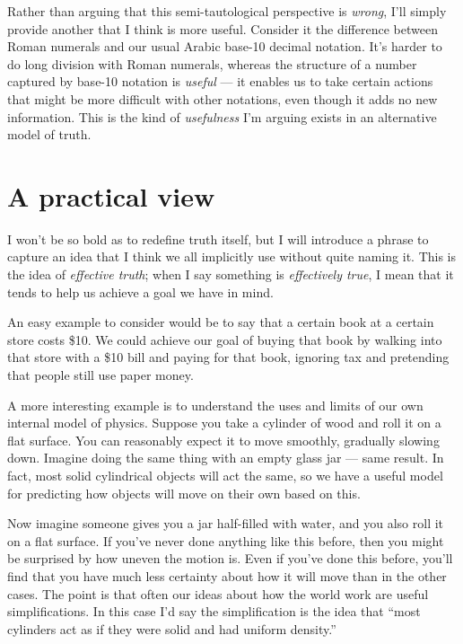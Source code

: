 \documentclass[20pt,]{extarticle}
\begin{document}
Rather than arguing that this semi-tautological perspective is
\emph{wrong}, I'll simply provide another that I think is more useful.
Consider it the difference between Roman numerals and our usual Arabic
base-10 decimal notation. It's harder to do long division with Roman
numerals, whereas the structure of a number captured by base-10 notation
is \emph{useful} --- it enables us to take certain actions that might be
more difficult with other notations, even though it adds no new
information. This is the kind of \emph{usefulness} I'm arguing exists in
an alternative model of truth.

\section{A practical view}\label{a-practical-view}

I won't be so bold as to redefine truth itself, but I will introduce a
phrase to capture an idea that I think we all implicitly use without
quite naming it. This is the idea of \emph{effective truth}; when I say
something is \emph{effectively true}, I mean that it tends to help us
achieve a goal we have in mind.

An easy example to consider would be to say that a certain book at a
certain store costs \$10. We could achieve our goal of buying that book
by walking into that store with a \$10 bill and paying for that book,
ignoring tax and pretending that people still use paper money.

A more interesting example is to understand the uses and limits of our
own internal model of physics. Suppose you take a cylinder of wood and
roll it on a flat surface. You can reasonably expect it to move
smoothly, gradually slowing down. Imagine doing the same thing with an
empty glass jar --- same result. In fact, most solid cylindrical objects
will act the same, so we have a useful model for predicting how objects
will move on their own based on this.

Now imagine someone gives you a jar half-filled with water, and you also
roll it on a flat surface. If you've never done anything like this
before, then you might be surprised by how uneven the motion is. Even if
you've done this before, you'll find that you have much less certainty
about how it will move than in the other cases. The point is that often
our ideas about how the world work are useful simplifications. In this
case I'd say the simplification is the idea that ``most cylinders act as
if they were solid and had uniform density.''
\end{document}
